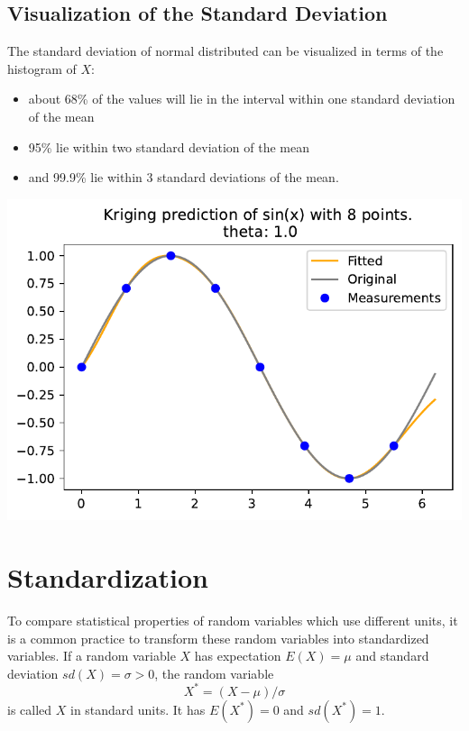 \documentclass[
  letterpaper,
  DIV=11,
  numbers=noendperiod]{scrreprt}
\providecommand{\tightlist}{%
  \setlength{\itemsep}{0pt}\setlength{\parskip}{0pt}}\usepackage{longtable,booktabs,array}
\begin{document}
\hypertarget{visualization-of-the-standard-deviation}{%
\subsection{Visualization of the Standard
Deviation}\label{visualization-of-the-standard-deviation}}

The standard deviation of normal distributed can be visualized in terms
of the histogram of \(X\):

\begin{itemize}
\tightlist
\item
  about 68\% of the values will lie in the interval within one standard
  deviation of the mean
\item
  95\% lie within two standard deviation of the mean
\item
  and 99.9\% lie within 3 standard deviations of the mean.
\end{itemize}

\includegraphics{006_num_gp_files/figure-pdf/cell-21-output-1.pdf}

\hypertarget{standardization}{%
\section{Standardization}\label{standardization}}

To compare statistical properties of random variables which use
different units, it is a common practice to transform these random
variables into standardized variables. If a random variable \(X\) has
expectation \(E(X) = \mu\) and standard deviation \(sd(X) = \sigma >0\),
the random variable \[
X^{\ast} = (X-\mu)/\sigma
\] is called \(X\) in standard units. It has \(E(X^{\ast}) = 0\) and
\(sd(X^{\ast}) =1\).
\end{document}
